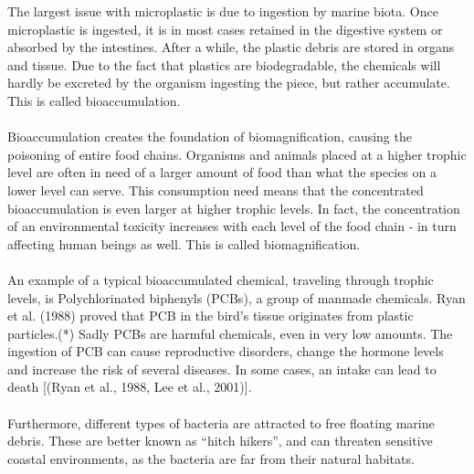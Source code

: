 
The largest issue with microplastic is due to ingestion by marine biota. Once microplastic is ingested, it is in most cases retained in the digestive system or absorbed by the intestines. After a while, the plastic debris are stored in organs and tissue. Due to the fact that plastics are biodegradable, the chemicals will hardly be excreted by the organism ingesting the piece, but rather accumulate. This is called bioaccumulation. 
\\\\
Bioaccumulation creates the foundation of biomagnification, causing the poisoning of entire food chains. Organisms and animals placed at a higher trophic level are often in need of a larger amount of food than what the species on a lower level can serve. This consumption need means that the concentrated bioaccumulation is even larger at higher trophic levels. In fact, the concentration of an environmental toxicity increases with each level of the food chain - in turn affecting human beings as well. This is called biomagnification. 
\\\\
An example of a typical bioaccumulated chemical, traveling through trophic levels, is Polychlorinated biphenyls (PCBs), a group of manmade chemicals. Ryan et al. (1988) proved that PCB in the bird's tissue originates from plastic particles.(*) Sadly PCBs are harmful chemicals, even in very low amounts. The ingestion of PCB can cause reproductive disorders, change the hormone levels and increase the risk of several diseases. In some cases, an intake can lead to death [(Ryan et al., 1988, Lee et al., 2001)].
\\\\
Furthermore, different types of bacteria are attracted to free floating marine debris. These are better known as “hitch hikers”, and can threaten sensitive coastal environments, as the bacteria are far from their natural habitats. 
